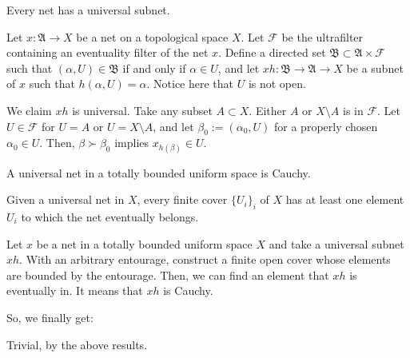 \documentclass[12pt]{article}
\begin{document}
\begin{thm}
Every net has a universal subnet.
\end{thm}
\begin{pf}
Let $x:\mathfrak{A}\to X$ be a net on a topological space $X$.
Let $\mathcal{F}$ be the ultrafilter containing an eventuality filter of the net $x$.
Define a directed set $\mathfrak{B}\subset\mathfrak{A}\times\mathcal{F}$ such that $(\alpha,U)\in\mathfrak{B}$ if and only if $\alpha\in U$, and let $xh:\mathfrak{B}\to\mathfrak{A}\to X$ be a subnet of $x$ such that $h(\alpha,U)=\alpha$.
Notice here that $U$ is not open.

We claim $xh$ is universal.
Take any subset $A\subset X$.
Either $A$ or $X\setminus A$ is in $\mathcal{F}$.
Let $U\in\mathcal{F}$ for $U=A$ or $U=X\setminus A$, and let $\beta_0:=(\alpha_0,U)$ for a properly chosen $\alpha_0\in U$.
Then, $\beta\succ\beta_0$ implies $x_{h(\beta)}\in U$.
\end{pf}

\begin{thm}
A universal net in a totally bounded uniform space is Cauchy.
\end{thm}
\begin{pf}
Given a universal net in $X$, every finite cover $\{U_i\}_i$ of $X$ has at least one element $U_i$ to which the net eventually belongs.

Let $x$ be a net in a totally bounded uniform space $X$ and take a universal subnet $xh$.
With an arbitrary entourage, construct a finite open cover whose elements are bounded by the entourage.
Then, we can find an element that $xh$ is eventually in.
It means that $xh$ is Cauchy.
\end{pf}

So, we finally get:

\begin{pf}[3 of Theorem 1.1.]
Trivial, by the above results.
\end{pf}




\end{document}
